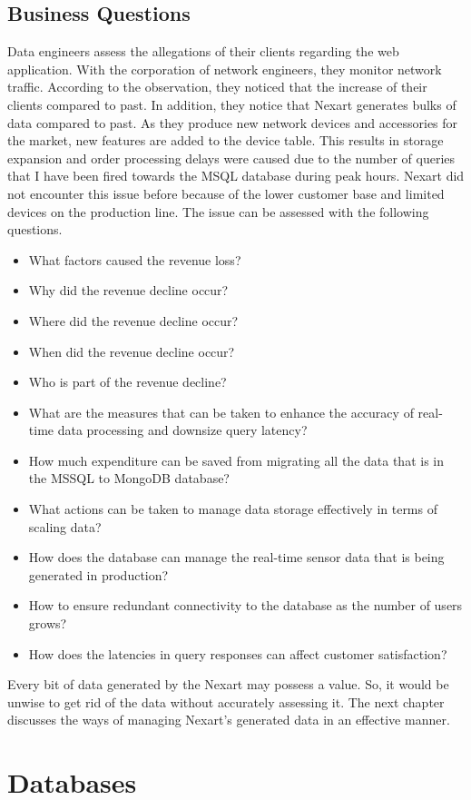 \documentclass[a4Paper,12pt]{report}
\begin{document}
\section{Business Questions}
Data engineers assess the allegations of their clients regarding the web application. With the corporation of network engineers, they monitor network traffic. According to the observation, they noticed that the increase of their clients compared to past. In addition, they notice that Nexart generates bulks of data compared to past. As they produce new network devices and accessories for the market, new features are added to the device table. This results in storage expansion and order processing delays were caused due to the number of queries that I have been fired towards the MSQL database during peak hours. Nexart did not encounter this issue before because of the lower customer base and limited devices on the production line. The issue can be assessed with the following questions.
\begin{itemize}
\item What factors caused the revenue loss? 
\item Why did the revenue decline occur?
\item Where did the revenue decline occur? 
\item When did the revenue decline occur? 
\item Who is part of the revenue decline? 
\item What are the measures that can be taken to enhance the accuracy of real-time data processing and downsize query latency? 
\item How much expenditure can be saved from migrating all the data that is in the MSSQL to MongoDB database? 
\item What actions can be taken to manage data storage effectively in terms of scaling data? 
\item How does the database can manage the real-time sensor data that is being generated in production? 
\item How to ensure redundant connectivity to the database as the number of users grows?
\item How does the latencies in query responses can affect customer satisfaction?
\end{itemize}
Every bit of data generated by the Nexart may possess a value. So, it would be unwise to get rid of the data without accurately assessing it. The next chapter discusses the ways of managing Nexart’s generated data in an effective manner.
\chapter{Databases}
\end{document}
